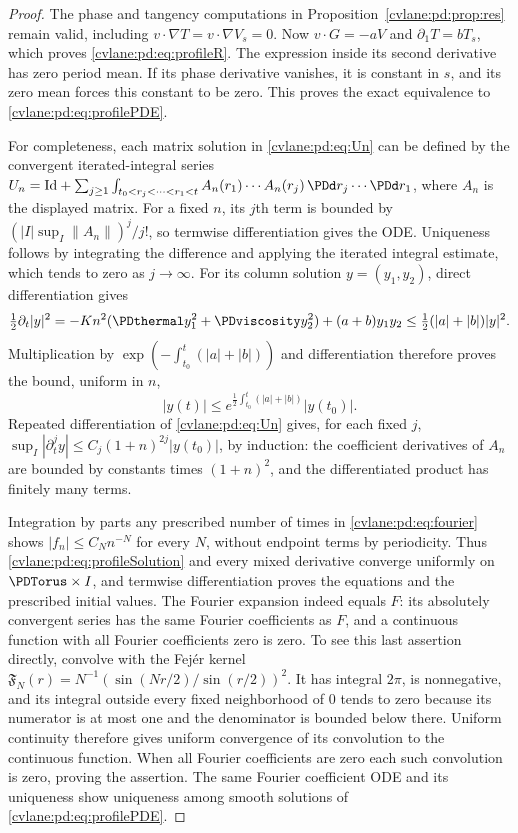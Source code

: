 \begin{proof}
The phase and tangency computations in Proposition~\ref{cvlane:pd:prop:res} remain
valid, including $v\cdot\nabla T=v\cdot\nabla V_s=0$.
Now $v\cdot G=-aV$ and $\partial_1T=bT_s$, which proves
\eqref{cvlane:pd:eq:profileR}. The expression inside its second derivative has zero
period mean. If its phase derivative vanishes, it is constant in $s$,
and its zero mean forces this constant to be zero. This proves the exact
equivalence to \eqref{cvlane:pd:eq:profilePDE}.

For completeness, each matrix solution in \eqref{cvlane:pd:eq:Un} can be defined by
the convergent iterated-integral series
$U_n=\mathrm{Id}+\sum_{j\geq1}\int_{t_0<r_j<\cdots<r_1<t}
 A_n(r_1)\cdots A_n(r_j)\,\PDd r_j\cdots\PDd r_1$, where $A_n$ is the
displayed matrix. For a fixed $n$, its $j$th term is bounded by
$(|I|\sup_I\|A_n\|)^j/j!$, so termwise differentiation gives the ODE.
Uniqueness follows by integrating the difference and applying the
iterated integral estimate, which tends to zero as $j\to\infty$.
For its column solution $y=(y_1,y_2)$, direct differentiation gives
\[
 \tfrac12\partial_t|y|^2
 =-Kn^2(\PDthermal y_1^2+\PDviscosity y_2^2)+(a+b)y_1y_2
 \leq \tfrac12(|a|+|b|)|y|^2.
\]
Multiplication by $\exp(-\int_{t_0}^t(|a|+|b|))$ and differentiation
therefore proves the bound, uniform in $n$,
\[
 |y(t)|\leq e^{\frac12\int_{t_0}^t(|a|+|b|)}|y(t_0)|.
\]
Repeated differentiation of \eqref{cvlane:pd:eq:Un} gives, for each fixed $j$,
$\sup_I|\partial_t^j y|\leq C_j(1+n)^{2j}|y(t_0)|$, by induction:
the coefficient derivatives of $A_n$ are bounded by constants times
$(1+n)^2$, and the differentiated product has finitely many terms.

Integration by parts any prescribed number of times in \eqref{cvlane:pd:eq:fourier}
shows $|f_n|\leq C_N n^{-N}$ for every $N$, without endpoint terms by
periodicity. Thus \eqref{cvlane:pd:eq:profileSolution} and every mixed derivative
converge uniformly on $\PDTorus\times I$, and termwise differentiation proves
the equations and the prescribed initial values. The Fourier expansion
indeed equals $F$: its absolutely convergent series has the same Fourier
coefficients as $F$, and a continuous function with all Fourier
coefficients zero is zero. To see this last assertion directly, convolve
with the Fej\'er kernel
$\mathfrak F_N(r)=N^{-1}(\sin(Nr/2)/\sin(r/2))^2$.
It has integral $2\pi$, is nonnegative, and its integral outside every
fixed neighborhood of $0$ tends to zero because its numerator is at
most one and the denominator is bounded below there. Uniform continuity
therefore gives uniform convergence of its convolution to the continuous
function. When all Fourier coefficients are zero each such convolution
is zero, proving the assertion. The same Fourier coefficient ODE and
its uniqueness show uniqueness among smooth solutions of
\eqref{cvlane:pd:eq:profilePDE}.
\end{proof}

